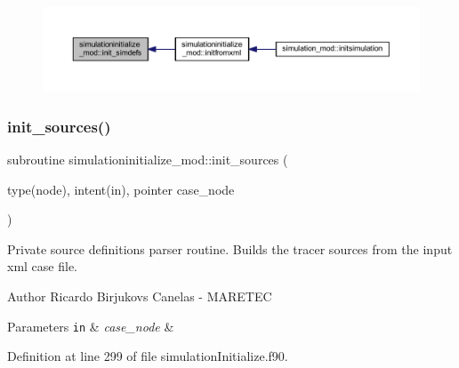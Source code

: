 \begin{figure}[H]
\begin{center}
\leavevmode
\includegraphics[width=350pt]{namespacesimulationinitialize__mod_af6b2508d52e9e29aeb6e7dfbabd88e8d_icgraph}
\end{center}
\end{figure}
\mbox{\label{namespacesimulationinitialize__mod_acaa6b217159e3a10e7db04dd7b0e4058}} 
\subsubsection{\texorpdfstring{init\+\_\+sources()}{init\_sources()}}
{\footnotesize\ttfamily subroutine simulationinitialize\+\_\+mod\+::init\+\_\+sources (\begin{DoxyParamCaption}\item[{type(node), intent(in), pointer}]{case\+\_\+node }\end{DoxyParamCaption})\hspace{0.3cm}{\ttfamily [private]}}



Private source definitions parser routine. Builds the tracer sources from the input xml case file. 

\begin{DoxyAuthor}{Author}
Ricardo Birjukovs Canelas -\/ M\+A\+R\+E\+T\+EC 
\end{DoxyAuthor}

\begin{DoxyParams}[1]{Parameters}
\mbox{\tt in}  & {\em case\+\_\+node} & \\
\hline
\end{DoxyParams}


Definition at line 299 of file simulation\+Initialize.\+f90.


